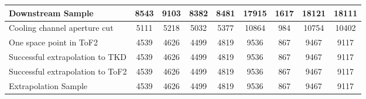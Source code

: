 \begin{landscape}
\begin{table}
\begin{tabular}[pos]{l|cccccccc}
\hline                                            
Downstream Sample                                  &    8543  &    9103  &    8382  &    8481  &   17915  &    1617  &   18121  &   18111  \\
\hline                                            
Cooling channel aperture cut                       &    5111  &    5218  &    5032  &    5377  &   10864  &     984  &   10754  &   10402  \\
One space point in ToF2                            &    4539  &    4626  &    4499  &    4819  &    9536  &     867  &    9467  &    9117  \\
Successful extrapolation to TKD                    &    4539  &    4626  &    4499  &    4819  &    9536  &     867  &    9467  &    9117  \\
Successful extrapolation to ToF2                   &    4539  &    4626  &    4499  &    4819  &    9536  &     867  &    9467  &    9117  \\
\hline                                            
Extrapolation Sample                               &    4539  &    4626  &    4499  &    4819  &    9536  &     867  &    9467  &    9117  \\
\hline                                            

\end{tabular}
\end{table}
\end{landscape}


